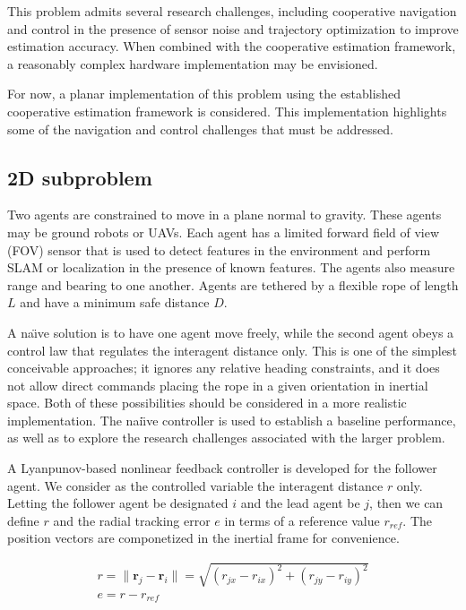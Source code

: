 \documentclass{aiaa-tc}
\newcommand{\B}[1]{\textbf{#1}} %
\begin{document}
This problem admits several research challenges, including cooperative navigation and control in the presence of sensor noise and trajectory optimization to improve estimation accuracy. When combined with the cooperative estimation framework, a reasonably complex hardware implementation may be envisioned.

For now, a planar implementation of this problem using the established cooperative estimation framework is considered. This implementation highlights some of the navigation and control challenges that must be addressed.

\subsection{2D subproblem}

Two agents are constrained to move in a plane normal to gravity. These agents may be ground robots or UAVs. Each agent has a limited forward field of view (FOV) sensor that is used to detect features in the environment and perform SLAM or localization in the presence of known features. The agents also measure range and bearing to one another. Agents are tethered by a flexible rope of length $L$ and have a minimum safe distance $D$.

A na\"{\i}ve solution is to have one agent move freely, while the second agent obeys a control law that regulates the interagent distance only. This is one of the simplest conceivable approaches; it ignores any relative heading constraints, and it does not allow direct commands placing the rope in a given orientation in inertial space. Both of these possibilities should be considered in a more realistic implementation. The nai\"{\i}ve controller is used to establish a baseline performance, as well as to explore the research challenges associated with the larger problem.

A Lyanpunov-based nonlinear feedback controller is developed for the follower agent. We consider as the controlled variable the interagent distance $r$ only. Letting the follower agent be designated $i$ and the lead agent be $j$, then we can define $r$ and the radial tracking error $e$ in terms of a reference value $r_{ref}$. The position vectors are componetized in the inertial frame for convenience.

\begin{align}
r = \| \B{r}_j - \B{r}_i \| = \sqrt{ (r_{jx}-r_{ix})^2 + (r_{jy}-r_{iy})^2} \label{eq:rdef} \\
e = r - r_{ref}
\end{align}
\end{document}
